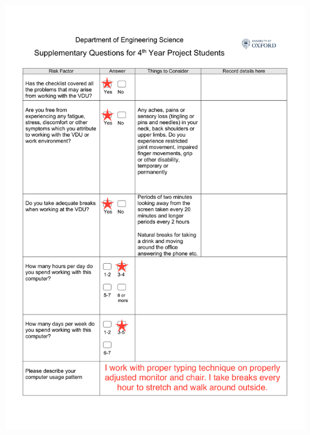 \documentclass[11pt, oneside]{report}   	%
\newenvironment{changemargin}[3]{%
\begin{list}{}{%
\setlength{\topsep}{0pt}%
\setlength{\leftmargin}{#1}%
\setlength{\rightmargin}{#2}%
\setlength{\topmargin}{#3}%
\setlength{\listparindent}{\parindent}%
\setlength{\itemindent}{\parindent}%
\setlength{\parsep}{\parskip}%
}%
\item[]}{\end{list}}
\begin{document}
{\begin{changemargin}{-1in}{0in}{-1.5in}
	\includegraphics{RiskAssessment1.pdf}
	\thispagestyle{empty}
\end{changemargin}
\end{document}
